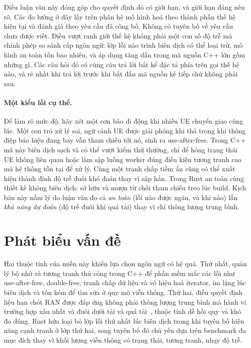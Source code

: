 Điều luận văn này đóng góp cho quyết định đó có giới hạn, và giới hạn đáng nêu rõ. Các đo
lường ở đây lấy trên phân hệ mô hình hoá theo thành phần thế hệ hiện tại và đánh giá theo
yêu cầu đã công bố. Không có tuyên bố về yêu cầu chưa được viết. Điều vượt ranh giới thế hệ
không phải một con số độ trễ mà chính phép so sánh cấp ngôn ngữ: lớp lỗi nào trình biên dịch
có thể loại trừ, mô hình an toàn tốn bao nhiêu, và áp dụng tăng dần trong mã nguồn C++ lớn
gồm những gì. Các câu hỏi đó có cùng câu trả lời bất kể đặc tả phía trên gọi thế hệ nào, và
rẻ nhất khi trả lời trước khi bắt đầu mã nguồn kế tiếp chứ không phải sau.

\paragraph{Một kiểu lỗi cụ thể.}
Để làm rõ mức độ, hãy xét một cơn bão di động khi nhiều UE chuyển giao cùng lúc. Một con trỏ
xử lý sai, ngữ cảnh UE được giải phóng khi thả trong khi thông điệp báo hiệu đang bay vẫn
tham chiếu tới nó, sinh ra use-after-free. Trong C++ mã này biên dịch sạch và có thể vượt
kiểm thử thường, chỉ để hỏng trạng thái UE không liên quan hoặc làm sập luồng worker đúng
điều kiện tương tranh cao mà hệ thống tồn tại để xử lý. Cùng một tranh chấp tiềm ẩn cũng có
thể xuất hiện thành đỉnh độ trễ đuôi khó đoán thay vì sập hẳn. Trong Rust an toàn cùng thiết
kế không biên dịch: sở hữu và mượn từ chối tham chiếu treo lúc build. Kịch bản này nắm lý do
luận văn đo cả \emph{an toàn} (lỗi nào được ngăn, và khi nào) lẫn \emph{khả năng dự đoán}
(độ trễ đuôi khi quá tải) thay vì chỉ thông lượng trung bình.

\section{Phát biểu vấn đề}
Hai thuộc tính của miền này khiến lựa chọn ngôn ngữ có hệ quả. Thứ nhất, quản lý bộ nhớ và
tương tranh thủ công trong C++ để phần mềm mắc các lỗi như use-after-free, double-free, tranh
chấp dữ liệu và vô hiệu hoá iterator, im lặng lúc biên dịch và tốn kém để tìm sửa ở quy mô
viễn thông. Thứ hai, điều quyết định liệu hạn chót RAN được đáp ứng không phải thông lượng
trung bình mà hành vi trường hợp xấu nhất và đuôi dưới tải và quá
tải~\cite{dean2013tail}, thuộc tính dễ hồi quy và khó đo đúng. Rust hứa loại bỏ lớp lỗi thứ
nhất lúc biên dịch trong khi tuyên bố hiệu năng cạnh tranh ở lớp thứ hai, song tuyên bố đó
chủ yếu dựa trên benchmark đa mục đích thay vì khối lượng viễn thông có trạng thái, tương
tranh, nhạy độ trễ.

